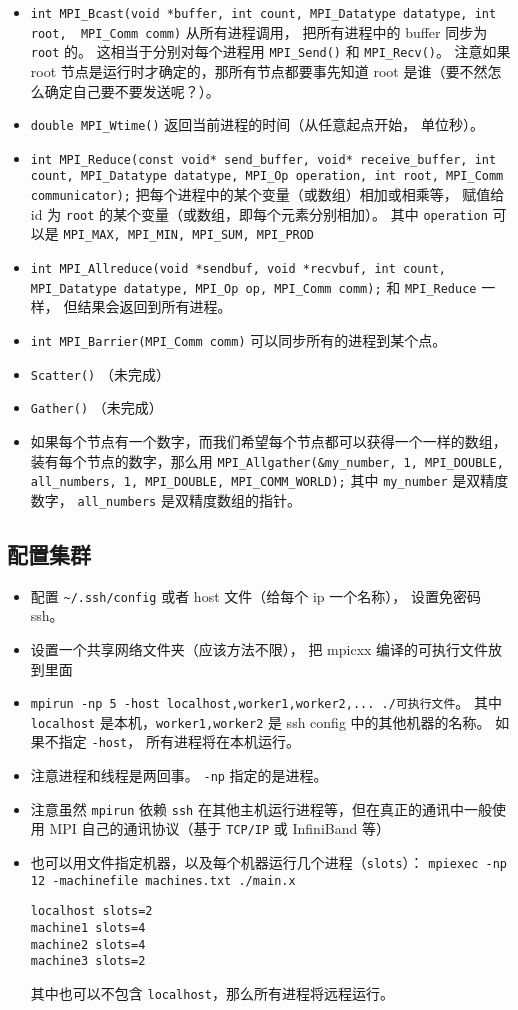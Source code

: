 \begin{itemize}
\item \verb|int MPI_Bcast(void *buffer, int count, MPI_Datatype datatype, int root,  MPI_Comm comm)| 从所有进程调用， 把所有进程中的 buffer 同步为 \verb`root` 的。 这相当于分别对每个进程用 \verb|MPI_Send()| 和 \verb|MPI_Recv()|。 注意如果 root 节点是运行时才确定的，那所有节点都要事先知道 root 是谁（要不然怎么确定自己要不要发送呢？）。
\item \verb|double MPI_Wtime()| 返回当前进程的时间（从任意起点开始， 单位秒）。
\item \verb|int MPI_Reduce(const void* send_buffer, void* receive_buffer, int count, MPI_Datatype datatype, MPI_Op operation, int root, MPI_Comm communicator);| 把每个进程中的某个变量（或数组）相加或相乘等， 赋值给 id 为 \verb|root| 的某个变量（或数组，即每个元素分别相加）。 其中 \verb|operation| 可以是 \verb|MPI_MAX, MPI_MIN, MPI_SUM, MPI_PROD|
\item \verb|int MPI_Allreduce(void *sendbuf, void *recvbuf, int count, MPI_Datatype datatype, MPI_Op op, MPI_Comm comm);| 和 \verb|MPI_Reduce| 一样， 但结果会返回到所有进程。
\item \verb|int MPI_Barrier(MPI_Comm comm)| 可以同步所有的进程到某个点。
\item \verb|Scatter()| （未完成）
\item \verb|Gather()| （未完成）
\item 如果每个节点有一个数字，而我们希望每个节点都可以获得一个一样的数组，装有每个节点的数字，那么用 \verb`MPI_Allgather(&my_number, 1, MPI_DOUBLE, all_numbers, 1, MPI_DOUBLE, MPI_COMM_WORLD);` 其中 \verb`my_number` 是双精度数字， \verb`all_numbers` 是双精度数组的指针。
\end{itemize}

\subsection{配置集群}
\begin{itemize}
\item 配置 \verb`~/.ssh/config` 或者 host 文件（给每个 ip 一个名称）， 设置免密码 ssh。
\item 设置一个共享网络文件夹（应该方法不限）， 把 mpicxx 编译的可执行文件放到里面
\item \verb|mpirun -np 5 -host localhost,worker1,worker2,... ./可执行文件|。 其中 \verb`localhost` 是本机，\verb`worker1,worker2` 是 ssh config 中的其他机器的名称。 如果不指定 \verb`-host`， 所有进程将在本机运行。
\item 注意进程和线程是两回事。 \verb`-np` 指定的是进程。
\item 注意虽然 \verb`mpirun` 依赖 \verb`ssh` 在其他主机运行进程等，但在真正的通讯中一般使用 MPI 自己的通讯协议（基于 \verb`TCP/IP` 或 InfiniBand 等）
\item 也可以用文件指定机器，以及每个机器运行几个进程（\verb`slots`）： \verb`mpiexec -np 12 -machinefile machines.txt ./main.x`
\begin{lstlisting}[language=none,caption=machines.txt]
localhost slots=2
machine1 slots=4
machine2 slots=4
machine3 slots=2
\end{lstlisting}
其中也可以不包含 \verb`localhost`，那么所有进程将远程运行。
\end{itemize}
